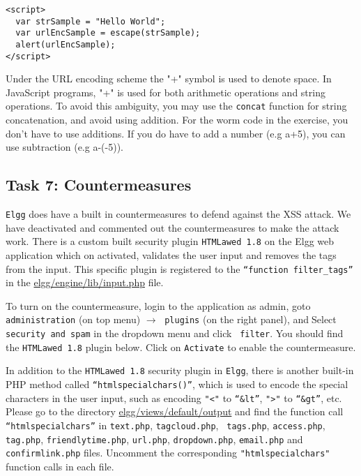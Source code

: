 {\footnotesize
\begin{Verbatim}[frame=single]
<script>
  var strSample = "Hello World";
  var urlEncSample = escape(strSample);
  alert(urlEncSample);
</script>
\end{Verbatim}
}

Under the URL encoding scheme 
the "+" symbol is used to denote space. In JavaScript programs, 
"+" is used for both arithmetic operations and string operations. 
To avoid this ambiguity, you may use the {\tt concat} function for string concatenation,
and avoid using addition. For the worm code in the exercise, you don't have to use additions.
If you do have to add a number (e.g a+5), you can use subtraction (e.g a-(-5)).


\subsection{Task 7: Countermeasures}

{\tt Elgg} does have a built in countermeasures to defend against the XSS attack.
We have deactivated and commented out the countermeasures to make the
attack work.
There is a custom built security plugin {\tt HTMLawed 1.8} on the Elgg web
application which on activated, validates the user input and removes the
tags from the input. This specific plugin is registered to the
{\tt “function filter\_tags”} in the \url{elgg/engine/lib/input.php} file.


To turn on the countermeasure, login to the application as admin, goto
{\tt administration} (on top menu) $\rightarrow$ {\tt plugins} (on the right panel),
andSelect {\tt security and spam} in the dropdown menu and click {\tt
filter}. You should find the {\tt HTMLawed 1.8} plugin below. 
Click on {\tt Activate} to enable the countermeasure.


In addition to the {\tt HTMLawed 1.8} security plugin in {\tt Elgg}, there is another
built-in PHP method called {\tt “htmlspecialchars()”}, which is used to encode the special
characters in the user input, such as encoding {\tt "<"} to {\tt “\&lt”}, 
{\tt ">"} to {\tt “\&gt”}, etc. Please go to
the directory \url{elgg/views/default/output} and find the function call
{\tt “htmlspecialchars”} in {\tt text.php}, {\tt tagcloud.php}, {\tt
tags.php}, {\tt access.php}, {\tt tag.php}, {\tt friendlytime.php}, 
{\tt url.php}, {\tt dropdown.php}, {\tt email.php} and
{\tt confirmlink.php} files. Uncomment the corresponding 
{\tt "htmlspecialchars"} function calls in each file. 


